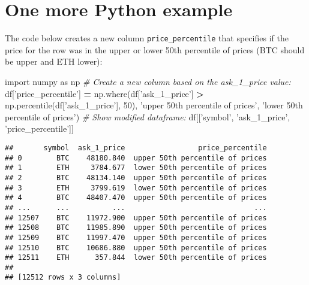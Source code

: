 \documentclass[
]{article}
\newenvironment{Shaded}{\begin{snugshade}}{\end{snugshade}}
\newcommand{\CommentTok}[1]{\textcolor[rgb]{0.56,0.35,0.01}{\textit{#1}}}
\newcommand{\DecValTok}[1]{\textcolor[rgb]{0.00,0.00,0.81}{#1}}
\newcommand{\ImportTok}[1]{#1}
\newcommand{\NormalTok}[1]{#1}
\newcommand{\OperatorTok}[1]{\textcolor[rgb]{0.81,0.36,0.00}{\textbf{#1}}}
\newcommand{\StringTok}[1]{\textcolor[rgb]{0.31,0.60,0.02}{#1}}
\begin{document}
\hypertarget{one-more-python-example}{%
\section{One more Python example}\label{one-more-python-example}}

The code below creates a new column \texttt{price\_percentile} that
specifies if the price for the row was in the upper or lower 50th
percentile of prices (BTC should be upper and ETH lower):

\begin{Shaded}
\begin{Highlighting}[]
\ImportTok{import}\NormalTok{ numpy }\ImportTok{as}\NormalTok{ np}
\CommentTok{# Create a new column based on the ask_1_price value:}
\NormalTok{df[}\StringTok{'price_percentile'}\NormalTok{] }\OperatorTok{=}\NormalTok{ np.where(df[}\StringTok{'ask_1_price'}\NormalTok{] }\OperatorTok{>} 
\NormalTok{                                  np.percentile(df[}\StringTok{'ask_1_price'}\NormalTok{], }\DecValTok{50}\NormalTok{),}
                            \StringTok{'upper 50th percentile of prices'}\NormalTok{, }
                            \StringTok{'lower 50th percentile of prices'}\NormalTok{)}
\CommentTok{# Show modified dataframe:}
\NormalTok{df[[}\StringTok{'symbol'}\NormalTok{, }\StringTok{'ask_1_price'}\NormalTok{, }\StringTok{'price_percentile'}\NormalTok{]]}
\end{Highlighting}
\end{Shaded}

\begin{verbatim}
##       symbol  ask_1_price                 price_percentile
## 0        BTC    48180.840  upper 50th percentile of prices
## 1        ETH     3784.677  lower 50th percentile of prices
## 2        BTC    48134.140  upper 50th percentile of prices
## 3        ETH     3799.619  lower 50th percentile of prices
## 4        BTC    48407.470  upper 50th percentile of prices
## ...      ...          ...                              ...
## 12507    BTC    11972.900  upper 50th percentile of prices
## 12508    BTC    11985.890  upper 50th percentile of prices
## 12509    BTC    11997.470  upper 50th percentile of prices
## 12510    BTC    10686.880  upper 50th percentile of prices
## 12511    ETH      357.844  lower 50th percentile of prices
## 
## [12512 rows x 3 columns]
\end{verbatim}
\end{document}

